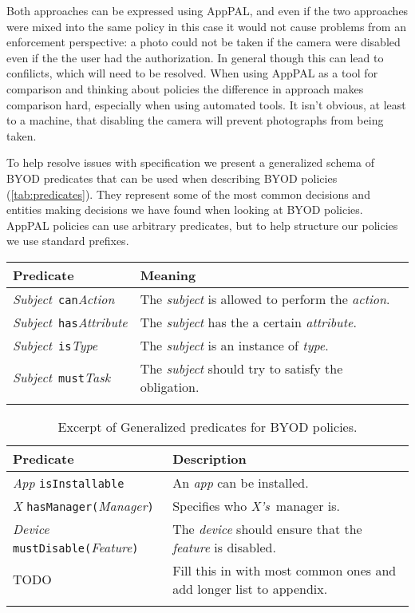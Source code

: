 \documentclass[a4paper]{article}
\begin{document}
Both approaches can be expressed using AppPAL, and even if the two
approaches were mixed into the same policy in this case it would not
cause problems from an enforcement perspective: a photo could not be
taken if the camera were disabled even if the the user had the
authorization.  In general though this can lead to confilicts, which
will need to be resolved.  When using AppPAL as a tool for comparison
and thinking about policies the difference in approach makes
comparison hard, especially when using automated tools.  It isn't
obvious, at least to a machine, that disabling the camera will prevent
photographs from being taken.

To help resolve issues with specification we present a generalized schema of BYOD predicates that can be used when describing BYOD policies (\autoref{tab:predicates}).  They represent some of the most common decisions and entities making decisions we have found when looking at BYOD policies.
AppPAL policies can use arbitrary predicates, but to help structure our policies we use standard prefixes.

\begin{minipage}{\textwidth}
  \footnotesize
  \centering
\newcommand{\PrefixT}[3]{\textit{#1}~\texttt{#2}\textit{#3}}
\begin{tabular}{l l}
  \toprule
  Predicate & Meaning \\
  \midrule
  \PrefixT{Subject}{can}{Action} & The \emph{subject} is allowed to perform the \emph{action}. \\
  \PrefixT{Subject}{has}{Attribute} & The \emph{subject} has the a certain \emph{attribute}. \\
  \PrefixT{Subject}{is}{Type} & The \emph{subject} is an instance of \emph{type}. \\
  \PrefixT{Subject}{must}{Task} & The \emph{subject} should try to satisfy the obligation. \\
  \bottomrule\\
\end{tabular}
\end{minipage}

\begin{table}
  \footnotesize
  \newcommand{\Obj}[1]{\textit{#1}}
  \newcommand{\Sbj}[1]{\texttt{#1}}
  \newcommand{\Sba}[2]{\Sbj{#1(}\Obj{#2}\Sbj{)}}
\begin{tabular}{p{} p{}}
  \toprule
  Predicate & Description \\
  \midrule
  \Obj{App} \Sbj{isInstallable} & An \emph{app} can be installed. \\
  \Obj{X} \Sba{hasManager}{Manager} & Specifies who \emph{X's}~manager is. \\
  \Obj{Device} \Sba{mustDisable}{Feature} & The \emph{device} should ensure that the \emph{feature} is disabled. \\
  TODO & Fill this in with most common ones and add longer list to appendix. \\
  \bottomrule \\
\end{tabular}
\label{tab:predicates}
\caption{Excerpt of Generalized predicates for BYOD policies.}
\end{table}
\end{document}
